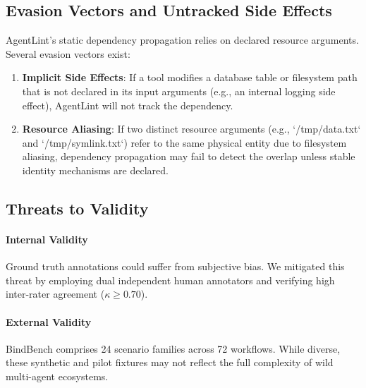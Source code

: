 \subsection{Evasion Vectors and Untracked Side Effects}
AgentLint's static dependency propagation relies on declared resource arguments. Several evasion vectors exist:
\begin{enumerate}
    \item \textbf{Implicit Side Effects}: If a tool modifies a database table or filesystem path that is not declared in its input arguments (e.g., an internal logging side effect), AgentLint will not track the dependency.
    \item \textbf{Resource Aliasing}: If two distinct resource arguments (e.g., `/tmp/data.txt` and `/tmp/symlink.txt`) refer to the same physical entity due to filesystem aliasing, dependency propagation may fail to detect the overlap unless stable identity mechanisms are declared.
\end{enumerate}

\subsection{Threats to Validity}
\paragraph{Internal Validity} Ground truth annotations could suffer from subjective bias. We mitigated this threat by employing dual independent human annotators and verifying high inter-rater agreement ($\kappa \ge 0.70$).
\paragraph{External Validity} \textsf{BindBench} comprises 24 scenario families across 72 workflows. While diverse, these synthetic and pilot fixtures may not reflect the full complexity of wild multi-agent ecosystems.

